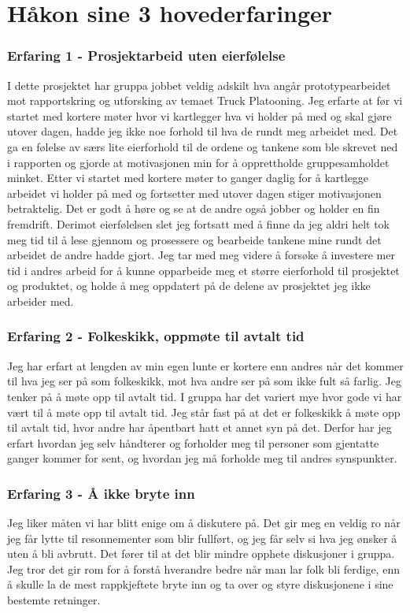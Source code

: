\section{Håkon sine 3 hovederfaringer}

\subsubsection*{Erfaring 1 - Prosjektarbeid uten eierfølelse}
I dette prosjektet har gruppa jobbet veldig adskilt hva angår prototypearbeidet mot rapportskring og utforsking av temaet Truck Platooning. Jeg erfarte at før vi startet med kortere møter hvor vi kartlegger hva vi holder på med og skal gjøre utover dagen, hadde jeg ikke noe forhold til hva de rundt meg arbeidet med. Det ga en følelse av særs lite eierforhold til de ordene og tankene som ble skrevet ned i rapporten og gjorde at motivasjonen min for å opprettholde gruppesamholdet minket. Etter vi startet med kortere møter to ganger daglig for å kartlegge arbeidet vi holder på med og fortsetter med utover dagen stiger motivasjonen betraktelig. Det er godt å høre og se at de andre også jobber og holder en fin fremdrift. Derimot eierfølelsen slet jeg fortsatt med å finne da jeg aldri helt tok meg tid til å lese gjennom og prosessere og bearbeide tankene mine rundt det arbeidet de andre hadde gjort. Jeg tar med meg videre å forsøke å investere mer tid i andres arbeid for å kunne opparbeide meg et større eierforhold til prosjektet og produktet, og holde å meg oppdatert på de delene av prosjektet jeg ikke arbeider med.  

\subsubsection*{Erfaring 2 - Folkeskikk, oppmøte til avtalt tid}
Jeg har erfart at lengden av min egen lunte er kortere enn andres når det kommer til hva jeg ser på som folkeskikk, mot hva andre ser på som ikke fult så farlig. Jeg tenker på å møte opp til avtalt tid. I gruppa har det variert mye hvor gode vi har vært til å møte opp til avtalt tid. Jeg står fast på at det er folkeskikk å møte opp til avtalt tid, hvor andre har åpentbart hatt et annet syn på det. Derfor har jeg erfart hvordan jeg selv håndterer og forholder meg til personer som gjentatte ganger kommer for sent, og hvordan jeg må forholde meg til andres synspunkter. 

\subsubsection*{Erfaring 3 - Å ikke bryte inn}
Jeg liker måten vi har blitt enige om å diskutere på. Det gir meg en veldig ro når jeg får lytte til resonnementer som blir fullført, og jeg får selv si hva jeg ønsker å uten å bli avbrutt. Det fører til at det blir mindre opphete diskusjoner i gruppa. Jeg tror det gir rom for å forstå hverandre bedre når man lar folk bli ferdige, enn å skulle la de mest rappkjeftete bryte inn og ta over og styre diskusjonene i sine bestemte retninger.  
